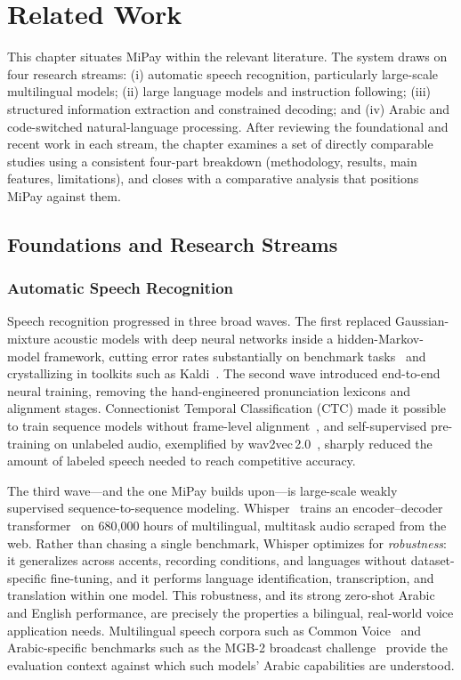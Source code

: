 \chapter{Related Work}

\setlength{\parindent}{1em}

This chapter situates MiPay within the relevant literature. The system draws on
four research streams: (i) automatic speech recognition, particularly
large-scale multilingual models; (ii) large language models and instruction
following; (iii) structured information extraction and constrained decoding; and
(iv) Arabic and code-switched natural-language processing. After reviewing the
foundational and recent work in each stream, the chapter examines a set of
directly comparable studies using a consistent four-part breakdown
(methodology, results, main features, limitations), and closes with a
comparative analysis that positions MiPay against them.

\section{Foundations and Research Streams}

\subsection{Automatic Speech Recognition}

Speech recognition progressed in three broad waves. The first replaced
Gaussian-mixture acoustic models with deep neural networks inside a
hidden-Markov-model framework, cutting error rates substantially on benchmark
tasks~\cite{hinton2012deep} and crystallizing in toolkits such as
Kaldi~\cite{povey2011kaldi}. The second wave introduced end-to-end neural
training, removing the hand-engineered pronunciation lexicons and alignment
stages. Connectionist Temporal Classification (CTC) made it possible to train
sequence models without frame-level alignment~\cite{graves2006ctc}, and
self-supervised pre-training on unlabeled audio, exemplified by
wav2vec\,2.0~\cite{baevski2020wav2vec}, sharply reduced the amount of labeled
speech needed to reach competitive accuracy.

The third wave---and the one MiPay builds upon---is large-scale weakly
supervised sequence-to-sequence modeling. Whisper~\cite{radford2023whisper}
trains an encoder--decoder transformer~\cite{vaswani2017attention} on 680{,}000
hours of multilingual, multitask audio scraped from the web. Rather than chasing
a single benchmark, Whisper optimizes for \emph{robustness}: it generalizes
across accents, recording conditions, and languages without dataset-specific
fine-tuning, and it performs language identification, transcription, and
translation within one model. This robustness, and its strong zero-shot Arabic
and English performance, are precisely the properties a bilingual,
real-world voice application needs. Multilingual speech corpora such as Common
Voice~\cite{ardila2020commonvoice} and Arabic-specific benchmarks such as the
MGB-2 broadcast challenge~\cite{ali2016mgb2} provide the evaluation context
against which such models' Arabic capabilities are understood.


